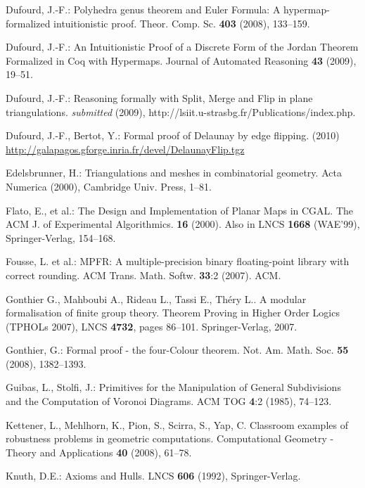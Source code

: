 \documentclass{llncs}
\begin{document}
\begin{thebibliography}{99}
Dufourd, J.-F.:
Polyhedra genus theorem and Euler Formula: A hypermap-formalized intuitionistic proof.
Theor. Comp. Sc. {\bfseries 403} (2008), 133--159.

Dufourd, J.-F.:
An Intuitionistic Proof of a Discrete Form of the Jordan Theorem 
Formalized in Coq with Hypermaps.
Journal of Automated Reasoning {\bfseries 43} (2009), 19--51.

Dufourd, J.-F.:
Reasoning formally with Split, Merge and Flip in plane triangulations.
{\em submitted} (2009), http://lsiit.u-strasbg.fr/Publications/index.php.

Dufourd, J.-F., Bertot, Y.:
Formal proof of Delaunay by edge flipping. (2010)
\url{http://galapagos.gforge.inria.fr/devel/DelaunayFlip.tgz}

Edelsbrunner, H.:
Triangulations and meshes in combinatorial geometry.
Acta Numerica (2000), Cambridge Univ. Press, 1--81.

Flato, E., et al.:
The Design and Implementation of Planar Maps in CGAL.
The ACM J. of Experimental Algorithmics. {\bfseries 16} (2000). Also in LNCS {\bfseries 1668} (WAE'99), Springer-Verlag, 154--168.

Fousse, L. et al.:
MPFR: A multiple-precision binary floating-point library with correct rounding.
ACM Trans. Math. Softw. {\bfseries 33}:2 (2007). ACM.

Gonthier G., Mahboubi A., Rideau L., Tassi E., Th{\'e}ry L..
\newblock A modular formalisation of finite group theory.
 Theorem Proving in Higher Order Logics
  (TPHOLs 2007), LNCS {\bfseries 4732}, pages 86--101. Springer-Verlag,
  2007.

Gonthier, G.:
Formal proof - the four-Colour theorem. 
Not. Am. Math. Soc. {\bfseries 55} (2008), 1382--1393.

Guibas, L., Stolfi, J.:
Primitives for the Manipulation of General Subdivisions and the Computation of Voronoi Diagrams.
ACM TOG {\bfseries 4}:2 (1985), 74--123.


Kettener, L., Mehlhorn, K., Pion, S., Scirra, S., Yap, C.
Classroom examples of robustness problems in geometric computations.
Computational Geometry - Theory and Applications {\bfseries 40} (2008), 61--78.

Knuth, D.E.:
Axioms and Hulls.
LNCS {\bfseries 606} (1992), Springer-Verlag.


\end{thebibliography}
\end{document}
